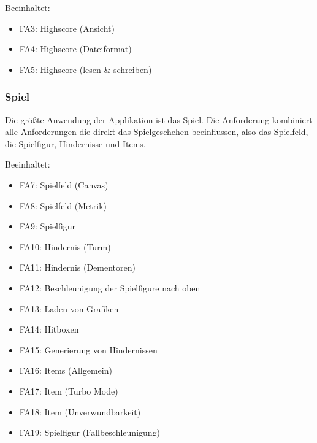 \documentclass[DIN, pagenumber=false, fontsize=11pt, parskip=half]{scrartcl}
\begin{document}
    Beeinhaltet:
    \begin{itemize}
        \item FA3: Highscore (Ansicht)
        \item FA4: Highscore (Dateiformat)
        \item FA5: Highscore (lesen \& schreiben)
    \end{itemize}
    \subsubsection{Spiel}
    Die größte Anwendung der Applikation ist das Spiel. Die Anforderung kombiniert alle Anforderungen die direkt das Spielgeschehen beeinflussen, also
    das Spielfeld, die Spielfigur, Hindernisse und Items.

    Beeinhaltet:
    \begin{itemize}
        \item FA7: Spielfeld (Canvas)
        \item FA8: Spielfeld (Metrik)
        \item FA9: Spielfigur
        \item FA10: Hindernis (Turm)
        \item FA11: Hindernis (Dementoren)
        \item FA12: Beschleunigung der Spielfigure nach oben
        \item FA13: Laden von Grafiken
        \item FA14: Hitboxen
        \item FA15: Generierung von Hindernissen
        \item FA16: Items (Allgemein)
        \item FA17: Item (Turbo Mode)
        \item FA18: Item (Unverwundbarkeit)
        \item FA19: Spielfigur (Fallbeschleunigung)
    \end{itemize}
    
    
\end{document}
